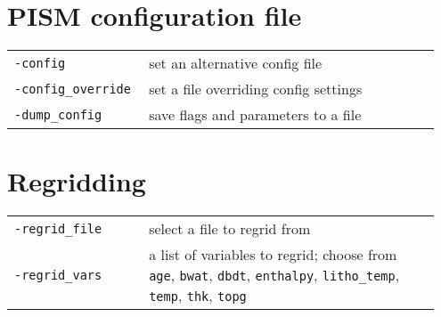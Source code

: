 \documentclass[landscape]{article}
\begin{document}
\begin{textblock}{15}
\section{PISM configuration file}
\label{sec:pism-config-file}
\begin{tabular}{@{}p{0.3\linewidth}p{0.65\linewidth}@{}}
\texttt{-config} & set an alternative config file\\
\texttt{-config_override} & set a file overriding config
settings\\
\texttt{-dump_config} & save flags and parameters to a file
\end{tabular}

\section{Regridding}
\label{sec:regridding}
\begin{tabular}{@{}p{0.3\linewidth}p{0.65\linewidth}@{}}
  \texttt{-regrid_file} & select a file to regrid from\\
  \texttt{-regrid_vars} & a list of variables to regrid; choose from
  \texttt{age}, \texttt{bwat}, \texttt{dbdt}, \texttt{enthalpy}, \texttt{litho_temp}, \texttt{temp},
  \texttt{thk}, \texttt{topg}\\
\end{tabular}


\end{textblock}
\end{document}
